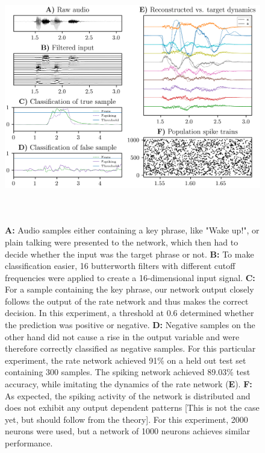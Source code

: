 \documentclass[twoside,11pt,titlepage]{article}
\begin{document}
\begin{figure}[!htb]
  \includegraphics[width = \columnwidth, height=11cm]{figures/figure3.png}
  \caption{\textbf{A:} Audio samples either containing a key phrase, like "Wake up!", or plain talking were
  presented to the network, which then had to decide whether the input was the target phrase or not.
  \textbf{B:} To make classification easier, 16 butterworth filters with different cutoff frequencies
  were applied to create a 16-dimensional input signal. \textbf{C:} For a sample containing the key phrase,
  our network output closely follows the output of the rate network and thus makes the correct decision. In this experiment,
  a threshold at 0.6 determined whether the prediction was positive or negative. \textbf{D:} Negative samples on the other hand
  did not cause a rise in the output variable and were therefore correctly classified as negative samples. For this particular experiment,
  the rate network achieved 91\% on a held out test set containing 300 samples. The spiking network achieved 89.03\% test accuracy,
  while imitating the dynamics of the rate network (\textbf{E}). \textbf{F:} As expected, the spiking activity of the
  network is distributed and does not exhibit any output dependent patterns [This is not the case yet, but should follow from the theory].
  For this experiment, 2000 neurons were used, but a network of 1000 neurons achieves similar performance.}
  \label{fig:figure3}
\end{figure}

\clearpage
\end{document}
